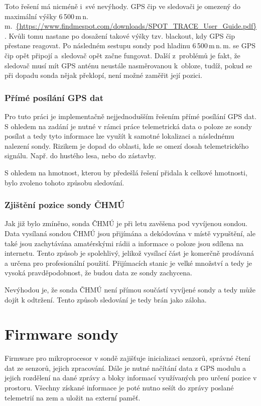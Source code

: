 \documentclass[twoside]{ctuthesis}
\theoremstyle{plain}
\theoremstyle{definition}
\theoremstyle{note}
\begin{document}
				Toto řešení má nicméně i~své nevýhody. GPS čip ve sledovači je omezený do maximální výšky 6\,500\,m\,n.\,m.~\url{{https://www.findmespot.com/downloads/SPOT_TRACE_User_Guide.pdf}}. Kvůli tomu nastane po dosažení takové výšky tzv. blackout, kdy GPS čip přestane reagovat. Po následném sestupu sondy pod hladinu 6\,500\,m\,n.\,m. se GPS čip opět připojí a~sledovač opět začne fungovat. Další z~problémů je fakt, že sledovač musí mít GPS anténu neustále nasměrovanou k~obloze, tudíž, pokud se při dopadu sonda nějak překlopí, není možné zaměřit její pozici.

				\subsubsection{Přímé posílání GPS dat}
				Pro tuto práci je implementačně nejjednodušším řešením přímé posílání GPS dat. S ohledem na zadání je nutné v rámci práce telemetrická data o poloze ze sondy posílat a tedy tyto informace lze využít k samotné lokalizaci a následnému nalezení sondy. Rizikem je dopad do oblasti, kde se omezí dosah telemetrického signálu. Např. do hustého lesa, nebo do zástavby.

				S ohledem na hmotnost, kterou by předešlá řešení přidala k celkové hmotnosti, bylo zvoleno tohoto způsobu sledování.

				\subsubsection{Zjištění pozice sondy ČHMÚ}
				Jak již bylo zmíněno, sonda ČHMÚ je při letu zavěšena pod vyvíjenou sondou. Data vysílaná sondou ČHMÚ jsou přijímána a dekódována v místě vypuštění, ale také jsou zachytávána amatérskými rádii a informace o poloze jsou sdílena na internetu. Tento způsob je spolehlivý, jelikož vysílací část je komerčně prodávaná a určena pro profesionální použití. Přijímacích stanic je velké množství a tedy je vysoká pravděpodobnost, že budou data ze sondy zachycena. 

				Nevýhodou je, že sonda ČHMÚ není přímou součástí vyvíjené sondy a tedy může dojít k odtržení. Tento způsob sledování je tedy brán jako záloha.


			
	\section{Firmware sondy}
	Firmware pro mikroprocesor v sondě zajišťuje inicializaci senzorů, správné čtení dat ze senzorů, jejich zpracování. Dále je nutné načítání data z GPS modulu a jejich rozdělení na dané zprávy a bloky informací využívaných pro určení pozice v prostoru. Všechny získané informace je poté nutno sešít do zprávy poslané telemetrií na zem a uložit na externí paměť. 
\end{document}
